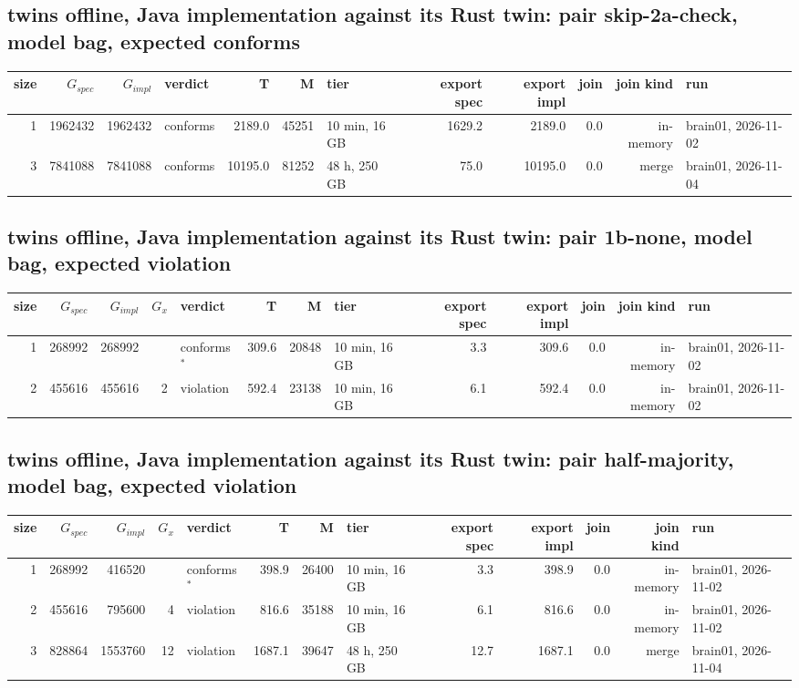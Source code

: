 \documentclass[10pt]{article}
\begin{document}
\subsection*{twins offline, Java implementation against its Rust twin: pair \textsf{skip-2a-check}, model bag, expected conforms}
\begin{longtable}{@{}rrrlrrlrrrrl@{}}
\toprule
size & $G_{\mathit{spec}}$ & $G_{\mathit{impl}}$ & verdict & T & M & tier & export spec & export impl & join & join kind & run \\
\midrule
\endhead
\color{red} 1 & 1962432 & 1962432 & conforms & 2189.0 & 45251 & 10 min, 16 GB & 1629.2 & 2189.0 & 0.0 & in-memory & brain01, 2026-11-02 \\
\color{blue} 3 & 7841088 & 7841088 & conforms & 10195.0 & 81252 & 48 h, 250 GB & 75.0 & 10195.0 & 0.0 & merge & brain01, 2026-11-04 \\
\bottomrule
\end{longtable}
\subsection*{twins offline, Java implementation against its Rust twin: pair \textsf{1b-none}, model bag, expected violation}
\begin{longtable}{@{}rrrrlrrlrrrrl@{}}
\toprule
size & $G_{\mathit{spec}}$ & $G_{\mathit{impl}}$ & $G_x$ & verdict & T & M & tier & export spec & export impl & join & join kind & run \\
\midrule
\endhead
\color{red} 1 & 268992 & 268992 &  & conforms$^{\ast}$ & 309.6 & 20848 & 10 min, 16 GB & 3.3 & 309.6 & 0.0 & in-memory & brain01, 2026-11-02 \\
\color{red} 2 & 455616 & 455616 & 2 & violation & 592.4 & 23138 & 10 min, 16 GB & 6.1 & 592.4 & 0.0 & in-memory & brain01, 2026-11-02 \\
\bottomrule
\end{longtable}
\subsection*{twins offline, Java implementation against its Rust twin: pair \textsf{half-majority}, model bag, expected violation}
\begin{longtable}{@{}rrrrlrrlrrrrl@{}}
\toprule
size & $G_{\mathit{spec}}$ & $G_{\mathit{impl}}$ & $G_x$ & verdict & T & M & tier & export spec & export impl & join & join kind & run \\
\midrule
\endhead
\color{red} 1 & 268992 & 416520 &  & conforms$^{\ast}$ & 398.9 & 26400 & 10 min, 16 GB & 3.3 & 398.9 & 0.0 & in-memory & brain01, 2026-11-02 \\
\color{red} 2 & 455616 & 795600 & 4 & violation & 816.6 & 35188 & 10 min, 16 GB & 6.1 & 816.6 & 0.0 & in-memory & brain01, 2026-11-02 \\
\color{blue} 3 & 828864 & 1553760 & 12 & violation & 1687.1 & 39647 & 48 h, 250 GB & 12.7 & 1687.1 & 0.0 & merge & brain01, 2026-11-04 \\
\bottomrule
\end{longtable}
\end{document}

